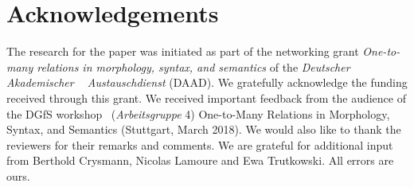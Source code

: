 \documentclass[output=paper]{langsci/langscibook}
\begin{document}


\section*{Acknowledgements}

The research for the paper was initiated as part of the networking grant \emph{One-to-many relations in morphology, syntax, and semantics} of the \textit{Deu\-tscher Akade\-mi\-scher
  Austauschdienst} (DAAD).
We gratefully acknowledge the funding received through this grant. We received important feedback from the audience of the DGfS workshop  (\textit{Arbeitsgruppe} 4) One-to-Many Relations in Morphology, Syntax, and Semantics (Stuttgart, March 2018). 
We would also like to thank the reviewers for their remarks and comments.
We are grateful for additional input from Berthold Crysmann, Nicolas Lamoure and Ewa Trutkowski.
All errors are ours.


\printbibliography[heading=subbibliography,notkeyword=this]
\end{document}
